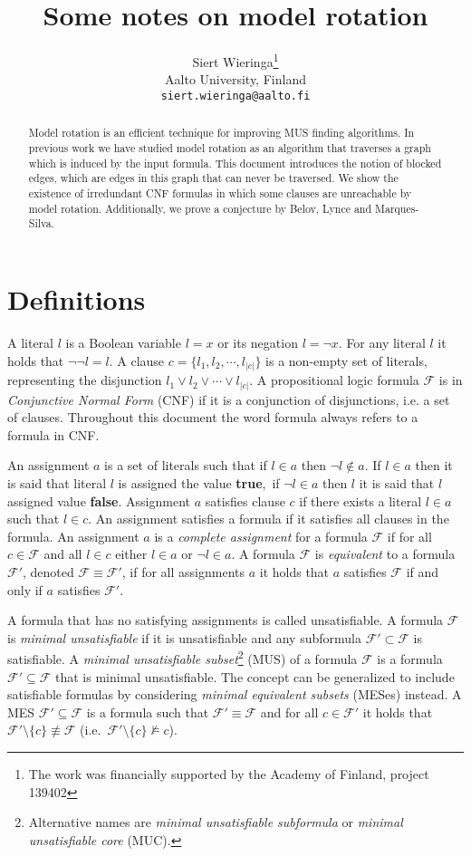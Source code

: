 \documentclass{article}
\author{Siert Wieringa\thanks{The work was financially supported by the Academy of Finland, project 139402} \\\medskip \small{Aalto University, Finland} \\\medskip \small{\texttt{siert.wieringa@aalto.fi}}}
\title{Some notes on model rotation}
\newcounter{algorithms}[section]
\newcommand{\F}{\mathcal{F}}
\newcommand{\true}{\textbf{true}}
\newcommand{\false}{\textbf{false}}
\begin{document}
\maketitle

\begin{abstract}
Model rotation is an efficient technique for improving MUS finding algorithms.
In previous work we have studied model rotation as an algorithm that traverses a graph which is induced by the input formula.
This document introduces the notion of blocked edges, which are edges in this graph that can never be traversed.
We show the existence of irredundant CNF formulas in which some clauses are unreachable by model rotation.
Additionally, we prove a conjecture by Belov, Lynce and Marques-Silva.
\end{abstract}

\section{Definitions}

A literal $l$ is a Boolean variable $l=x$ or its negation $l=\lnot x$.
For any literal $l$ it holds that $\lnot \lnot l = l$.
A clause $c=\{l_1, l_2, \cdots, l_{|c|}\}$ is a non-empty set of literals, representing the disjunction $l_1 \vee l_2 \vee \cdots \vee l_{|c|}$.
A propositional logic formula $\F$ is in \emph{Conjunctive Normal Form} (CNF) if it is a conjunction of disjunctions, i.e. a set of clauses.
Throughout this document the word formula always refers to a formula in CNF.

An assignment $a$ is a set of literals such that if $l \in a$ then $\lnot l \notin a$.
If $l \in a$ then it is said that literal $l$ is assigned the value \true,~if $\lnot l \in a$ then $l$ it is said that $l$ assigned value \false.
Assignment $a$ satisfies clause $c$ if there exists a literal $l \in a$ such that $l \in c$.
An assignment satisfies a formula if it satisfies all clauses in the formula.
An assignment $a$ is a \emph{complete assignment} for a formula $\F$ if for all $c \in \F$ and all $l \in c$ either $l \in a$ or $\lnot l \in a$.
A formula $\F$ is \emph{equivalent} to a formula $\F'$, denoted $\F \equiv \F'$, if for all assignments $a$ it holds that $a$ satisfies $\F$ if and only if $a$ satisfies $\F'$.

A formula that has no satisfying assignments is called unsatisfiable.
A formula $\F$ is \emph{minimal unsatisfiable} if it is unsatisfiable and any subformula $\F' \subset \F$ is satisfiable.
A \emph{minimal unsatisfiable subset}\footnote{Alternative names are \emph{minimal unsatisfiable subformula} or \emph{minimal unsatisfiable core} (MUC).} (MUS) of a formula $\F$ is a formula $\F' \subseteq \F$ that is minimal unsatisfiable.
The concept can be generalized to include satisfiable formulas by considering \emph{minimal equivalent subsets} (MESes) \cite{DBLP:conf/cp/BelovJLM12} instead.
A MES $\F' \subseteq \F$ is a formula such that $\F' \equiv \F$ and for all $c \in \F'$ it holds that $\F' \setminus \{c\} \not \equiv \F$ (i.e.\ $\F' \setminus \{c\} \not \models c$).
\end{document}

